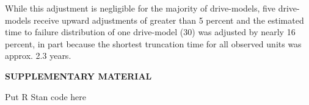 \documentclass[12pt]{article}
\begin{document}
While this adjustment is negligible for the majority of drive-models, five drive-models receive upward adjustments of greater than 5 percent and the estimated time to failure distribution of one drive-model (30) was adjusted by nearly 16 percent, in part because the shortest truncation time for all observed units was approx. 2.3 years.

\pagebreak

\begin{center}
{\large\bf SUPPLEMENTARY MATERIAL}
\end{center}

\begin{description}

\item Put R Stan code here

\end{description}
\end{document}
